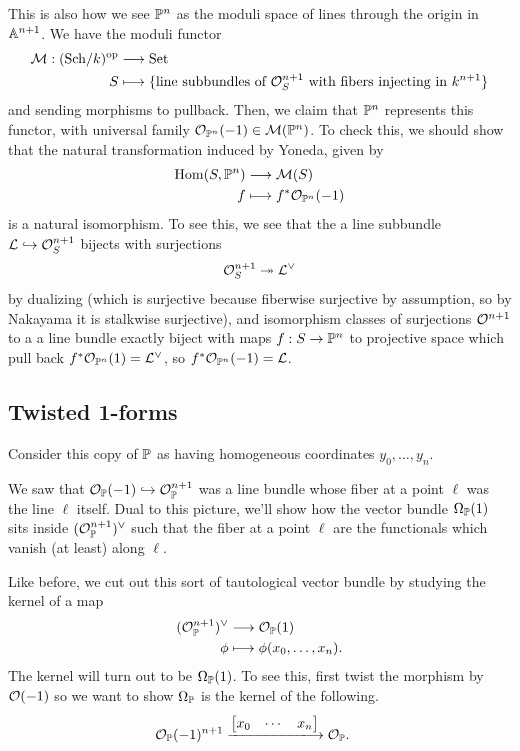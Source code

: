 \documentclass[12pt]{article}
\begin{document}
\begin{rmk}
    This is also how we see $\P^n$ as the moduli space of lines through the origin in $\A^{n+1}$. We have the moduli functor
    \begin{align*}
        \cM: (\Sch/k)^\op &\longrightarrow \Set\\
        S &\longmapsto \{\text{line subbundles of } \cO_S^{n+1} \text{ with fibers injecting in $k^{n+1}$}\}
    \end{align*}
    and sending morphisms to pullback. Then, we claim that $\P^n$ represents this functor, with universal family $\cO_{\P^n}(-1) \in \cM(\P^n)$. To check this, we should show that the natural transformation induced by Yoneda, given by
    \begin{align*}
        \Hom(S,\P^n) &\longrightarrow \cM(S)\\
        f &\longmapsto f^*\cO_{\P^n}(-1)
    \end{align*}
    is a natural isomorphism. To see this, we see that the a line subbundle $\cL\hookrightarrow \cO_S^{n+1}$ bijects with surjections
    \[\cO_S^{n+1} \twoheadrightarrow \cL^\vee\]
    by dualizing (which is surjective because fiberwise surjective by assumption, so by Nakayama it is stalkwise surjective), and isomorphism classes of surjections $\cO^{n+1}$ to a a line bundle exactly biject with maps $f:S\to \P^n$ to projective space which pull back $f^*\cO_{\P^n}(1) = \cL^\vee$, so $f^*\cO_{\P^n}(-1) = \cL$.
\end{rmk}

\subsection{Twisted 1-forms}
Consider this copy of $\P$ as having homogeneous coordinates $y_0,\dots,y_n$.

We saw that $\cO_\P(-1)\hookrightarrow \cO_\P^{n+1}$ was a line bundle whose fiber at a point $\ell$ was the line $\ell$ itself. Dual to this picture, we'll show how the vector bundle $\Omega_\P(1)$ sits inside $(\cO_\P^{n+1})^\vee$ such that the fiber at a point $\ell$ are the functionals which vanish (at least) along $\ell$.

Like before, we cut out this sort of tautological vector bundle by studying the kernel of a map
\begin{align*}
    (\cO_\P^{n+1})^\vee &\longrightarrow \cO_\P(1)\\
    \phi &\longmapsto \phi(x_0,\dots,x_n).
\end{align*}
The kernel will turn out to be $\Omega_\P(1)$. To see this, first twist the morphism by $\cO(-1)$ so we want to show $\Omega_\P$ is the kernel of the following. 
\begin{align*}
    \cO_\P(-1)^{n+1} &\xlongrightarrow{\begin{bmatrix}
        x_0 & \cdots & x_n
    \end{bmatrix}} \cO_\P.
\end{align*}
\end{document}
